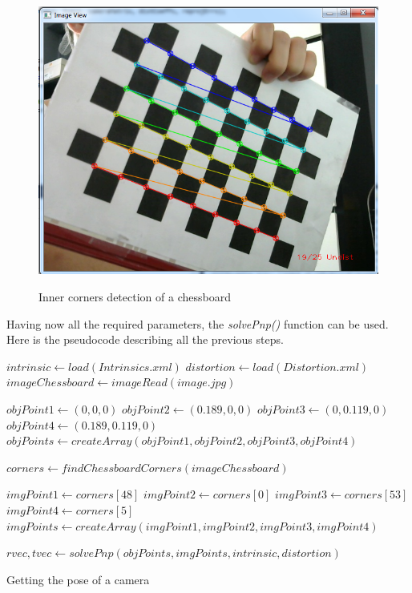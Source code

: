 \begin{figure}
\caption{Inner corners detection of a chessboard}
\centering
    \includegraphics[width=1.0\textwidth]{images/innerCorners.png}
\label{fig:inner corners detection}
\end{figure}


Having now all the required parameters, the \textit{solvePnp()} function can be used. Here is the pseudocode describing all the previous steps. 

\begin{algorithm}[H]
\label{algo:get individual pose}
  \begin{algorithmic}
    \State $intrinsic\gets load(Intrinsics.xml)$
    \State $distortion \gets load(Distortion.xml)$
    \State $imageChessboard \gets  imageRead(image.jpg)$ 

    \State $objPoint1 \gets  (0,0,0)$ 
    \State $objPoint2 \gets  (0.189,0,0)$ 
    \State $objPoint3 \gets  (0,0.119,0)$ 
    \State $objPoint4 \gets  (0.189,0.119,0)$ 
    \State $objPoints \gets  createArray(objPoint1, objPoint2, objPoint3, objPoint4)$ 

    \State $corners \gets  findChessboardCorners(imageChessboard)$
    
    \State $imgPoint1 \gets corners[48]$
    \State $imgPoint2 \gets corners[0]$
    \State $imgPoint3 \gets corners[53]$
    \State $imgPoint4 \gets corners[5]$
    \State $imgPoints \gets  createArray(imgPoint1, imgPoint2, imgPoint3, imgPoint4)$ 

    \State $rvec, tvec \gets  solvePnp(objPoints, imgPoints, intrinsic, distortion)$  
  \caption{Getting the pose of a camera}
  \end{algorithmic}
\end{algorithm}

